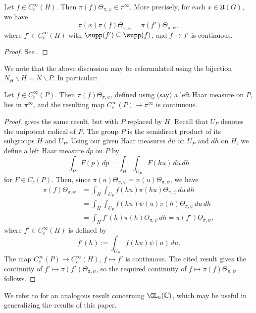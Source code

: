 \begin{theorem}[Jacquet]\label{thm:jacquet-on-kirillov-model}
  Let $f \in C_c^\infty(H)$.  Then $\pi(f) \Theta_{\pi,\psi} \in \pi^\infty$.  More precisely, for each $x \in \mathfrak{U}(G)$, we have
  \begin{equation}\label{eqn:pi-x-pi-f-Theta-pi-f-prime}
    \pi(x) \pi(f) \Theta_{\pi,\psi} = \pi(f') \Theta_{\pi,\psi},
  \end{equation}
  where $f' \in C_c^\infty(H)$ with $\supp(f') \subseteq \supp(f)$, and $f \mapsto f'$ is continuous.
\end{theorem}
\begin{proof}
  See \cite[\S3.2]{MR2733072}.
\end{proof}

We note that the above discussion may be reformulated using the bijection $N_H \backslash H = N \backslash P$.  In particular:
\begin{theorem}[Jacquet]\label{thm:jacquet-on-kirillov-model-P}
  Let $f \in C_c^\infty(P)$.  Then $\pi(f) \Theta_{\pi,\psi}$, defined using (say) a left Haar measure on $P$, lies in $\pi^\infty$, and the resulting map $C_c^\infty(P) \rightarrow \pi^\infty$ is continuous.
\end{theorem}
\begin{proof}
  \cite[Prop 4]{MR2733072} gives the same result, but with $P$ replaced by $H$.  Recall that $U_P$ denotes the unipotent radical of $P$.  The group $P$ is the semidirect product of its subgroups $H$ and $U_P$.  Using our given Haar measures $d u$ on $U_P$ and $d h$ on $H$, we define a left Haar measure $d p$ on $P$ by
  \begin{equation*}
    \int_{P} F(p) \, d p
    =
    \int_{H} \int_{U_P} F(h u) \, d u \, d h
  \end{equation*}
  for $F \in C_c(P)$.  Then, since $\pi(u)\Theta_{\pi,\psi}=\psi(u)\Theta_{\pi,\psi}$, we have
  \begin{align*}
    \pi(f) \Theta_{\pi, \psi}
    &=
      \int_{H} \int_{U_P}
      f(h u)
      \pi(h u)
      \Theta_{\pi, \psi}
      \, d u \, d h
    \\
    &=
      \int_{H} \int_{U_P}
      f(h u)
      \psi(u)
      \pi(h)
      \Theta_{\pi, \psi}
      \, d u \, d h \\
    &=
      \int_{H}
      f'(h)
      \pi(h)
      \Theta_{\pi, \psi} \, d h
      =
      \pi(f ') \Theta_{\pi, \psi},
  \end{align*}
  where $f' \in C_c^\infty(H)$ is defined by
  \begin{equation*}
    f'(h) := \int_{U_P} f(h u) \psi(u) \, d u.
  \end{equation*}
  The map $C_c^\infty(P) \rightarrow C_c^\infty(H)$, $f \mapsto f'$ is continuous.  The cited result gives the continuity of $f' \mapsto \pi(f') \Theta_{\pi,\psi}$, so the required continuity of $f \mapsto \pi(f) \Theta_{\pi, \psi}$ follows.
\end{proof}
We refer to \cite{MR3352025} for an analogous result concerning $\GL_n(\mathbb{C})$, which may be useful in generalizing the results of this paper.

